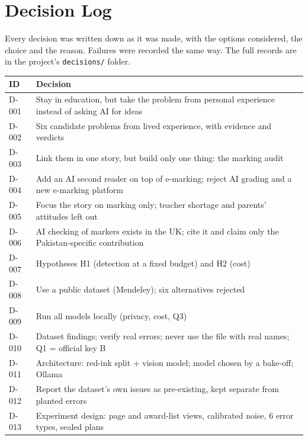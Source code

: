 \chapter{Decision Log}
\label{app:decisions}
Every decision was written down as it was made, with the options considered, the choice and the reason. Failures were
recorded the same way. The full records are in the project's \texttt{decisions/} folder.

\begin{small}
\begin{tabularx}{\linewidth}{@{}P{1.2cm}L@{}}
\toprule
\textbf{ID} & \textbf{Decision} \\
\midrule
D-001 & Stay in education, but take the problem from personal experience instead of asking AI for ideas  \\
D-002 & Six candidate problems from lived experience, with evidence and verdicts  \\
D-003 & Link them in one story, but build only one thing: the marking audit  \\
D-004 & Add an AI second reader on top of e-marking; reject AI grading and a new e-marking platform  \\
D-005 & Focus the story on marking only; teacher shortage and parents' attitudes left out  \\
D-006 & AI checking of markers exists in the UK; cite it and claim only the Pakistan-specific contribution  \\
D-007 & Hypotheses H1 (detection at a fixed budget) and H2 (cost)  \\
D-008 & Use a public dataset (Mendeley); six alternatives rejected  \\
D-009 & Run all models locally (privacy, cost, Q3)  \\
D-010 & Dataset findings; verify real errors; never use the file with real names; Q1 = official key B  \\
D-011 & Architecture: red-ink split + vision model; model chosen by a bake-off; Ollama  \\
D-012 & Report the dataset's own issues as pre-existing, kept separate from planted errors  \\
D-013 & Experiment design: page and award-list views, calibrated noise, 6 error types, sealed plans  \\

\end{tabularx}
\end{small}
